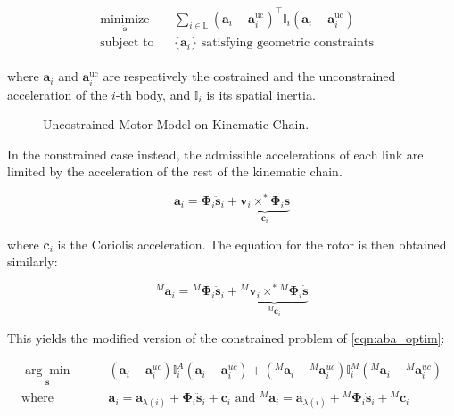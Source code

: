 \begin{align}
    \label{eqn:aba_optim}
    \begin{aligned}
         & \underset{\ddot{\mathbf{s}}}{\text{minimize}}
         &                                               & \sum _{i \in \mathbb{L}} (\mathbf{a}_i - \mathbf{a} _i ^{\text{uc} }) ^\top \mathbb{I} _i(\mathbf{a}_i - \mathbf{a} ^{\text{uc}} _i) \\
         & \text{subject to}
         &                                               & \{\mathbf{a}_i\} \text{ satisfying geometric constraints}
    \end{aligned}
\end{align}

where $\mathbf{a} _i$ and $\mathbf{a} _i ^{\text{uc}}$ are respectively the costrained and the unconstrained acceleration of the $i$-th body, and $\mathbb{I} _i$ is its spatial inertia.


\begin{figure}
    \centering
    \caption{Uncostrained Motor Model on Kinematic Chain.}
    \label{fig:disassembled_motor}
    \resizebox{0.8\textwidth}{!}{
        
    }
\end{figure}

In the constrained case instead, the admissible accelerations of each link are limited by the acceleration of the rest of the kinematic chain.

\begin{equation}
    \mathbf{a} _i = \boldsymbol{\Phi} _i \ddot{\mathbf{s}} _i + \underbrace{\mathbf{v} _i \times ^* \boldsymbol{\Phi} _i \dot{\mathbf{s}}} _{\mathbf{c} _i}
\end{equation}

where $\mathbf{c} _i$ is the Coriolis acceleration. The equation for the rotor is then obtained similarly:

\begin{equation}
    {} ^M \mathbf{a} _i = {} ^M \boldsymbol{\Phi} _i \ddot{\mathbf{s}} _i + \underbrace{{} ^M \mathbf{v} _i \times ^* {} ^M\boldsymbol{\Phi} _i \dot{\mathbf{s}}} _{{} ^M \mathbf{c} _i}
\end{equation}

This yields the modified version of the constrained problem of \cref{eqn:aba_optim}:

\begin{align}
    \underset{\ddot{\mathbf{s}}}{\arg \min} & \qquad (\mathbf{a} _i - \mathbf{a} _i ^{uc}) \mathbb{I} ^A _i (\mathbf{a} _i - \mathbf{a} _i ^{uc}) + ({} ^M \mathbf{a} _i - {} ^M \mathbf{a} _i ^{uc}) \mathbb{I} ^M _i ({} ^M \mathbf{a} _i - {} ^M \mathbf{a} _i ^{uc}) \nonumber                         \\
    \text{where }                           & \qquad \mathbf{a} _i = \mathbf{a} _{\lambda (i)} + \boldsymbol{\Phi} _i \ddot{\mathbf{s}} _i + \mathbf{c} _i \text{ and } {} ^M \mathbf{a} _i = \mathbf{a} _{\lambda (i)} + {} ^M  \boldsymbol{\Phi} _i \ddot{\mathbf{s}} _i + {} ^M \mathbf{c} _i \nonumber \\
\end{align}

